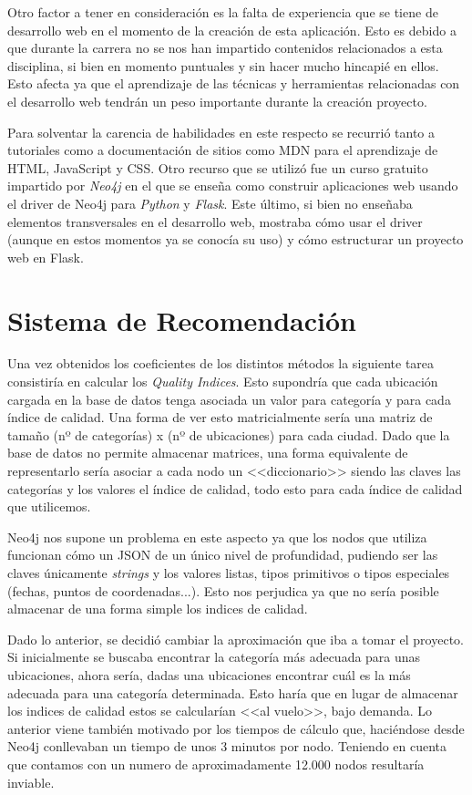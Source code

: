 Otro factor a tener en consideración es la falta de experiencia que se tiene de desarrollo web en el momento de la creación de esta aplicación. Esto es debido a que durante la carrera no se nos han impartido contenidos relacionados a esta disciplina, si bien en momento puntuales y sin hacer mucho hincapié en ellos. Esto afecta ya que el aprendizaje de las técnicas y herramientas relacionadas con el desarrollo web tendrán un peso importante durante la creación proyecto.

Para solventar la carencia de habilidades en este respecto se recurrió tanto a tutoriales como a documentación de sitios como MDN para el aprendizaje de HTML, JavaScript y CSS. Otro recurso que se utilizó fue un curso gratuito impartido por \textit{Neo4j} en el que se enseña como construir aplicaciones web usando el driver de Neo4j para \textit{Python} y \textit{Flask}. Este último, si bien no enseñaba elementos transversales en el desarrollo web, mostraba cómo usar el driver (aunque en estos momentos ya se conocía su uso) y cómo estructurar un proyecto web en Flask.

\section{Sistema de Recomendación}

Una vez obtenidos los coeficientes de los distintos métodos la siguiente tarea consistiría en calcular los \textit{Quality Indices}. Esto supondría que cada ubicación cargada en la base de datos tenga asociada un valor para categoría y para cada índice de calidad. Una forma de ver esto matricialmente sería una matriz de tamaño (nº de categorías) x (nº de ubicaciones) para cada ciudad. Dado que la base de datos no permite almacenar matrices, una forma equivalente de representarlo sería asociar a cada nodo un <<diccionario>> siendo las claves las categorías y los valores el índice de calidad, todo esto para cada índice de calidad que utilicemos.

Neo4j nos supone un problema en este aspecto ya que los nodos que utiliza funcionan cómo un JSON de un único nivel de profundidad, pudiendo ser las claves únicamente \textit{strings} y los valores listas, tipos primitivos o tipos especiales (fechas, puntos de coordenadas...). Esto nos perjudica ya que no sería posible almacenar de una forma simple los indices de calidad.

Dado lo anterior, se decidió cambiar la aproximación que iba a tomar el proyecto. Si inicialmente se buscaba encontrar la categoría más adecuada para unas ubicaciones, ahora sería, dadas una ubicaciones encontrar cuál es la más adecuada para una categoría determinada. Esto haría que en lugar de almacenar los indices de calidad estos se calcularían <<al vuelo>>, bajo demanda. Lo anterior viene también motivado por los tiempos de cálculo que, haciéndose desde Neo4j conllevaban un tiempo de unos 3 minutos por nodo. Teniendo en cuenta que contamos con un numero de aproximadamente 12.000 nodos resultaría inviable.

